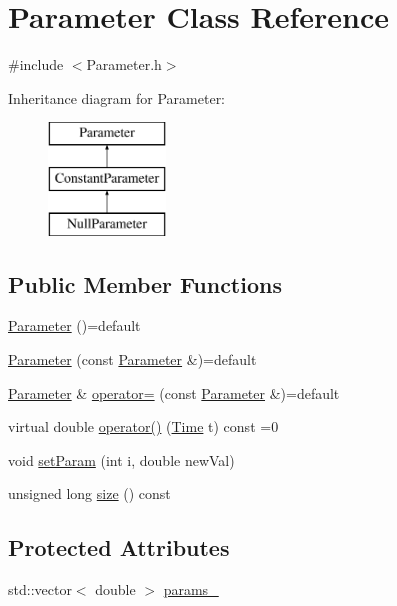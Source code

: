 \hypertarget{class_parameter}{}\section{Parameter Class Reference}
\label{class_parameter}


{\ttfamily \#include $<$Parameter.\+h$>$}

Inheritance diagram for Parameter\+:\begin{figure}[H]
\begin{center}
\leavevmode
\includegraphics[height=3.000000cm]{class_parameter}
\end{center}
\end{figure}
\subsection*{Public Member Functions}
\begin{DoxyCompactItemize}
\item 
\hyperlink{class_parameter_a5de1d76f6b0342f3e98d004733ce9c2c}{Parameter} ()=default
\item 
\hyperlink{class_parameter_a07b46a4af924cbaea806505343d7b83a}{Parameter} (const \hyperlink{class_parameter}{Parameter} \&)=default
\item 
\hyperlink{class_parameter}{Parameter} \& \hyperlink{class_parameter_ac7e34f069ed1474901fce2f06e0ee54f}{operator=} (const \hyperlink{class_parameter}{Parameter} \&)=default
\item 
virtual double \hyperlink{class_parameter_ae6317fac3d0b5e69101eb7059d151ca7}{operator()} (\hyperlink{_name_def_8h_ac2d3e0ba793497bcca555c7c2cf64ff3}{Time} t) const =0
\item 
void \hyperlink{class_parameter_a8cebb26e89537b098c8b42ef9aeb0f66}{set\+Param} (int i, double new\+Val)
\item 
unsigned long \hyperlink{class_parameter_ae1ca6e3ab5f2d2ed3bffbdee6e941068}{size} () const
\end{DoxyCompactItemize}
\subsection*{Protected Attributes}
\begin{DoxyCompactItemize}
\item 
std\+::vector$<$ double $>$ \hyperlink{class_parameter_abcbcc6573234afb8f6027d3c716917bb}{params\+\_\+}
\end{DoxyCompactItemize}


